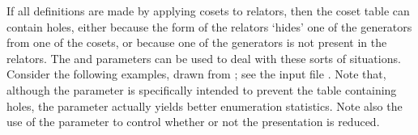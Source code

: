 


If all definitions are made by applying cosets to relators, then the coset
  table can contain holes, either because the form of the relators `hides'
  one of the generators from one of the cosets, or because one of the
  generators is not present in the relators.
The  and  parameters can be used to deal with these
  sorts of situations.
Consider the following examples, drawn from \cite{War77}; see the input file
  .
Note that, although the  parameter is specifically intended to
  prevent the table containing holes, the  parameter actually
  yields better enumeration statistics.
Note also the use of the  parameter to control whether or not
  the presentation is reduced.

